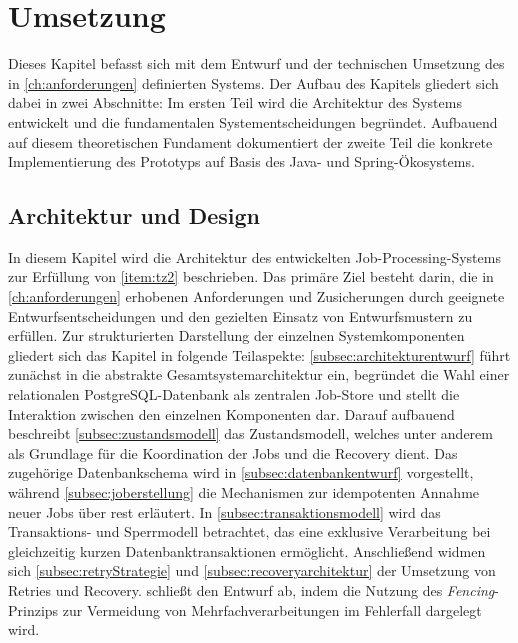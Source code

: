 
\chapter{Umsetzung}
\label{ch:umsetzung}
Dieses Kapitel befasst sich mit dem Entwurf und der technischen Umsetzung des in \cref{ch:anforderungen} definierten Systems.
Der Aufbau des Kapitels gliedert sich dabei in zwei Abschnitte:
Im ersten Teil wird die Architektur des Systems entwickelt und die fundamentalen Systementscheidungen begründet.
Aufbauend auf diesem theoretischen Fundament dokumentiert der zweite Teil die konkrete Implementierung des Prototyps auf
Basis des Java- und Spring-Ökosystems.

\section{Architektur und Design}
\label{sec:architektur}
In diesem Kapitel wird die Architektur des entwickelten Job-Processing-Systems zur Erfüllung von \ref{item:tz2} beschrieben.
Das primäre Ziel besteht darin, die in \cref{ch:anforderungen} erhobenen Anforderungen und Zusicherungen durch geeignete
Entwurfsentscheidungen und den gezielten Einsatz von Entwurfsmustern zu erfüllen.
Zur strukturierten Darstellung der einzelnen Systemkomponenten gliedert sich das Kapitel in folgende Teilaspekte:
\cref{subsec:architekturentwurf} führt zunächst in die abstrakte Gesamtsystemarchitektur ein, begründet die Wahl einer relationalen
PostgreSQL-Datenbank als zentralen Job-Store und stellt die Interaktion zwischen den einzelnen Komponenten dar.
Darauf aufbauend beschreibt \cref{subsec:zustandsmodell} das Zustandsmodell, welches unter anderem als Grundlage für die
Koordination der Jobs und die Recovery dient.
Das zugehörige Datenbankschema wird in \cref{subsec:datenbankentwurf} vorgestellt, während \cref{subsec:joberstellung}
die Mechanismen zur idempotenten Annahme neuer Jobs über \gls{rest} erläutert.
In \cref{subsec:transaktionsmodell} wird das Transaktions- und Sperrmodell betrachtet, das eine exklusive
Verarbeitung bei gleichzeitig kurzen Datenbanktransaktionen ermöglicht.
Anschließend widmen sich \cref{subsec:retryStrategie} und \cref{subsec:recoveryarchitektur} der Umsetzung von Retries und Recovery.
 schließt den Entwurf ab, indem die Nutzung des \textit{Fencing}-Prinzips zur Vermeidung
von Mehrfachverarbeitungen im Fehlerfall dargelegt wird.

